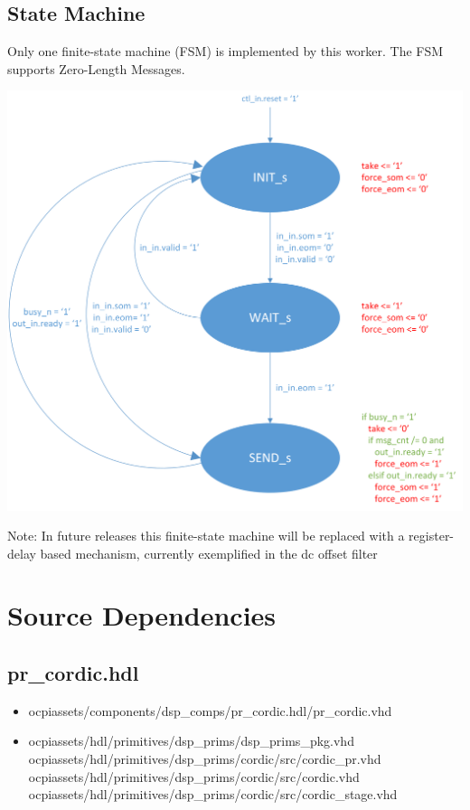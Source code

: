 \documentclass{article}
\def\comp{pr\_cordic}
\begin{document}
	\subsection*{State Machine}
	\begin{flushleft}
		Only one finite-state machine (FSM) is implemented by this worker. The FSM supports Zero-Length Messages.
	\end{flushleft}
	{\centering\captionsetup{type=figure}\includegraphics[scale=0.6]{zlm_fsm}\par{}\label{fig:zlm_fsm}}
        \begin{flushleft}
                Note: In future releases this finite-state machine will be replaced with a register-delay based mechanism, currently exemplified in the dc offset filter
        \end{flushleft}


\section*{Source Dependencies}
\subsection*{\comp.hdl}
\begin{itemize}
	\item ocpiassets/components/dsp\_comps/pr\_cordic.hdl/pr\_cordic.vhd
	\item ocpiassets/hdl/primitives/dsp\_prims/dsp\_prims\_pkg.vhd
	      \subitem ocpiassets/hdl/primitives/dsp\_prims/cordic/src/cordic\_pr.vhd
	      \subitem ocpiassets/hdl/primitives/dsp\_prims/cordic/src/cordic.vhd
	      \subitem ocpiassets/hdl/primitives/dsp\_prims/cordic/src/cordic\_stage.vhd
\end{itemize}
\end{document}
